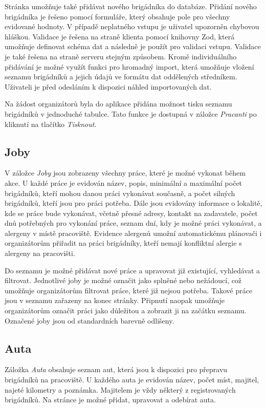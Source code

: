 Stránka umožňuje také přidávat nového brigádníka do databáze. Přidání nového brigádníka je řešeno pomocí formuláře, který obsahuje pole pro všechny evidované
hodnoty. V případě neplatného vstupu je uživatel upozorněn chybovou hláškou. Validace je řešena na straně klienta pomocí knihovny Zod, která umožňuje definovat
schéma dat a následně je použít pro validaci vstupu. Validace je také řešena na straně serveru stejným způsobem. Kromě individuálního přidávání je možné využít
funkci pro hromadný import, která umožňuje vložení seznamu brigádníků a jejich údajů ve formátu dat oddělených středníkem. Uživateli je před odesláním
k dispozici náhled importovaných dat.

Na žádost organizátorů byla do aplikace přidána možnost tisku seznamu brigádníků v jednoduché tabulce. Tato funkce je dostupná v záložce \textit{Pracanti} po kliknutí
na tlačítko \textit{Tisknout}.

\subsection{Joby}

V záložce \textit{Joby} jsou zobrazeny všechny práce, které je možné vykonat během akce. U každé práce je evidován název, popis, minimální
a maximální počet brigádníků, kteří mohou danou práci vykonávat současně, a počet silných brigádníků, kteří jsou pro práci potřeba. Dále jsou evidovány
informace o lokalitě, kde se práce bude vykonávat, včetně přesné adresy, kontakt na zadavatele, počet dnů potřebných pro vykonání práce, 
seznam dní, kdy je možné práci vykonávat, a alergeny v místě pracoviště. Evidence alergenů umožní automatickému plánovači i organizátorům přiřadit na práci brigádníky, kteří nemají
konfliktní alergie s alergeny na pracovišti. 

Do seznamu je možné přidávat nové práce a upravovat již existující, vyhledávat a filtrovat.
Jednotlivé joby je možné označit jako splněné nebo nežádoucí, což umožňuje organizátorům filtrovat práce, které již nejsou potřeba. Takové práce jsou v seznamu
zařazeny na konec stránky. Připnutí naopak umožňuje organizátorům označit práci jako důležitou a zobrazit ji na začátku seznamu. Označené joby jsou od standardních
barevně odlišeny.

\subsection{Auta}

Záložka \textit{Auta} obsahuje seznam aut, která jsou k dispozici pro přepravu brigádníků na pracoviště. U každého auta je evidován název, počet míst, majitel,
najeté kilometry a poznámka. Majitelem je vždy některý z registrovaných brigádníků. Na stránce je možné přidat, upravovat a odebírat auta.

